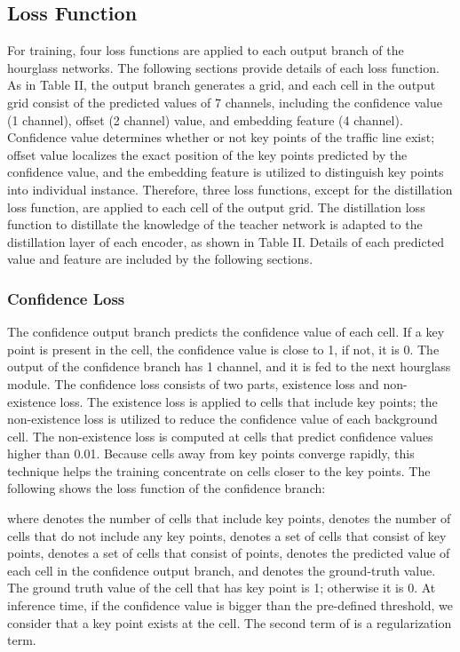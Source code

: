 \documentclass[journal]{IEEEtran}
\begin{document}
\subsection{Loss Function}
For training, four loss functions are applied to each output branch of the hourglass networks. The following sections provide details of each loss function. As in Table II, the output branch generates a  grid, and each cell in the output grid consist of the predicted values of 7 channels, including the confidence value (1 channel), offset (2 channel) value, and embedding feature (4 channel). Confidence value determines whether or not key points of the traffic line exist; offset value localizes the exact position of the key points predicted by the confidence value, and the embedding feature is utilized to distinguish key points into individual instance. Therefore, three loss functions, except for the distillation loss function, are applied to each cell of the output grid. The distillation loss function to distillate the knowledge of the teacher network is adapted to the distillation layer of each encoder, as shown in Table II. Details of each predicted value and feature are included by the following sections.



\subsubsection{Confidence Loss}
The confidence output branch predicts the confidence value of each cell. If a key point is present in the cell, the confidence value is close to 1, if not, it is 0. The output of the confidence branch has 1 channel, and it is fed to the next hourglass module. The confidence loss consists of two parts, existence loss and non-existence loss. The existence loss is applied to cells that include key points; the non-existence loss is utilized to reduce the confidence value of each background cell. The non-existence loss is computed at cells that predict confidence values higher than 0.01. Because cells away from key points converge rapidly, this technique helps the training concentrate on cells closer to the key points. The following shows the loss function of the confidence branch:


where  denotes the number of cells that include key points,  denotes the number of cells that do not include any key points,  denotes a set of cells that consist of key points,  denotes a set of cells that consist of points,  denotes the predicted value of each cell in the confidence output branch, and  denotes the ground-truth value. The ground truth value of the cell that has key point is 1; otherwise it is 0. At inference time, if the confidence value is bigger than the pre-defined threshold, we consider that a key point exists at the cell. The second term of  is a regularization term.
\end{document}
